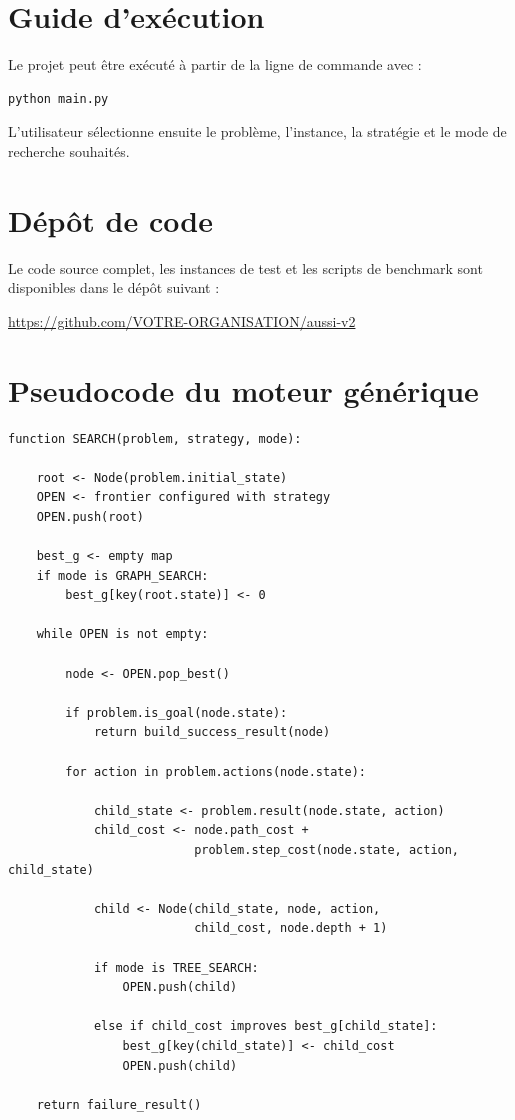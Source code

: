 \section{Guide d'exécution}

Le projet peut être exécuté à partir de la ligne de commande avec :

\begin{lstlisting}[numbers=none]
python main.py
\end{lstlisting}

L'utilisateur sélectionne ensuite le problème, l'instance, la stratégie et le
mode de recherche souhaités.

\section{Dépôt de code}

Le code source complet, les instances de test et les scripts de benchmark sont
disponibles dans le dépôt suivant :

\begin{center}
\url{https://github.com/VOTRE-ORGANISATION/aussi-v2}
\end{center}

\section{Pseudocode du moteur générique}

\begin{lstlisting}[caption={Pseudocode conceptuel de la fonction SEARCH.}]
function SEARCH(problem, strategy, mode):

    root <- Node(problem.initial_state)
    OPEN <- frontier configured with strategy
    OPEN.push(root)

    best_g <- empty map
    if mode is GRAPH_SEARCH:
        best_g[key(root.state)] <- 0

    while OPEN is not empty:

        node <- OPEN.pop_best()

        if problem.is_goal(node.state):
            return build_success_result(node)

        for action in problem.actions(node.state):

            child_state <- problem.result(node.state, action)
            child_cost <- node.path_cost +
                          problem.step_cost(node.state, action, child_state)

            child <- Node(child_state, node, action,
                          child_cost, node.depth + 1)

            if mode is TREE_SEARCH:
                OPEN.push(child)

            else if child_cost improves best_g[child_state]:
                best_g[key(child_state)] <- child_cost
                OPEN.push(child)

    return failure_result()
\end{lstlisting}

